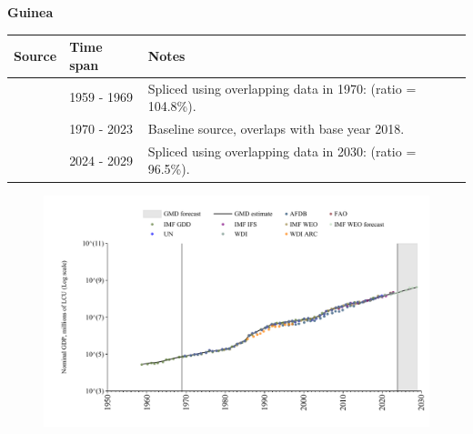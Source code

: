 \documentclass[12pt,a4paper,landscape]{article}
\begin{document}
\begin{adjustbox}{max totalsize={\paperwidth}{\paperheight},center}
\begin{minipage}[t][\textheight][t]{\textwidth}
\vspace*{0.5cm}
{}
\begin{center}
{\Large\bfseries Guinea}
\end{center}
\vspace{0.5cm}
\begin{table}[H]
\centering
\small
\begin{tabular}{|l|l|l|}
\hline
\textbf{Source} & \textbf{Time span} & \textbf{Notes} \\
\hline
\rowcolor{white}\cite{IMF_GDD}& 1959 - 1969 &Spliced using overlapping data in 1970: (ratio = 104.8\%).\\
\rowcolor{lightgray}\cite{WDI}& 1970 - 2023 &Baseline source, overlaps with base year 2018.\\
\rowcolor{white}\cite{IMF_WEO_forecast}& 2024 - 2029 &Spliced using overlapping data in 2030: (ratio = 96.5\%).\\
\hline
\end{tabular}
\end{table}
\begin{figure}[H]
\centering
\includegraphics[width=\textwidth,height=0.6\textheight,keepaspectratio]{graphs/GIN_nGDP.pdf}
\end{figure}
\end{minipage}
\end{adjustbox}
\end{document}
